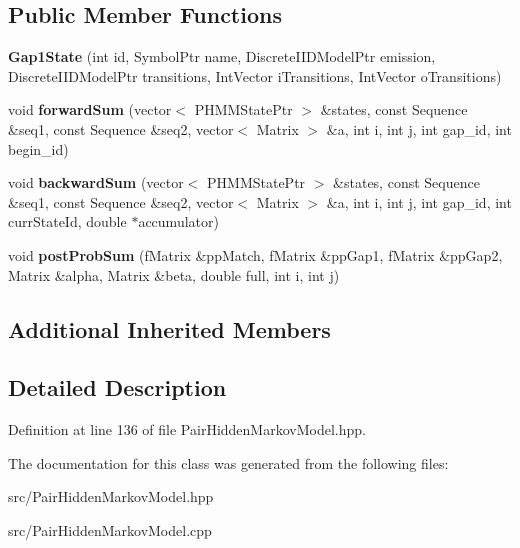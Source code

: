 \subsection*{Public Member Functions}
\begin{DoxyCompactItemize}
\item 
\mbox{\label{classtops_1_1Gap1State_a2a9530e58e72bd1fcd45334232ea30b9}} 
{\bfseries Gap1\+State} (int id, Symbol\+Ptr name, Discrete\+I\+I\+D\+Model\+Ptr emission, Discrete\+I\+I\+D\+Model\+Ptr transitions, Int\+Vector i\+Transitions, Int\+Vector o\+Transitions)
\item 
\mbox{\label{classtops_1_1Gap1State_a893baf7ce3eb45b398d59c57dfcc97f6}} 
void {\bfseries forward\+Sum} (vector$<$ P\+H\+M\+M\+State\+Ptr $>$ \&states, const Sequence \&seq1, const Sequence \&seq2, vector$<$ Matrix $>$ \&a, int i, int j, int gap\+\_\+id, int begin\+\_\+id)
\item 
\mbox{\label{classtops_1_1Gap1State_a24d5685c33fb3902b92aee9e718de7ee}} 
void {\bfseries backward\+Sum} (vector$<$ P\+H\+M\+M\+State\+Ptr $>$ \&states, const Sequence \&seq1, const Sequence \&seq2, vector$<$ Matrix $>$ \&a, int i, int j, int gap\+\_\+id, int curr\+State\+Id, double $\ast$accumulator)
\item 
\mbox{\label{classtops_1_1Gap1State_ad509beb6d2f6d573aca8c0a6152eefe5}} 
void {\bfseries post\+Prob\+Sum} (f\+Matrix \&pp\+Match, f\+Matrix \&pp\+Gap1, f\+Matrix \&pp\+Gap2, Matrix \&alpha, Matrix \&beta, double full, int i, int j)
\end{DoxyCompactItemize}
\subsection*{Additional Inherited Members}


\subsection{Detailed Description}


Definition at line 136 of file Pair\+Hidden\+Markov\+Model.\+hpp.



The documentation for this class was generated from the following files\+:\begin{DoxyCompactItemize}
\item 
src/Pair\+Hidden\+Markov\+Model.\+hpp\item 
src/Pair\+Hidden\+Markov\+Model.\+cpp\end{DoxyCompactItemize}

